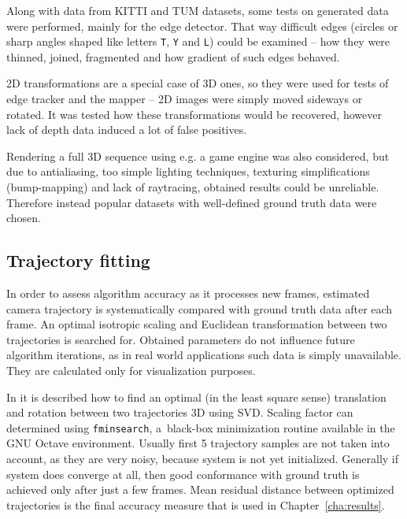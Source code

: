 Along with data from KITTI and TUM datasets, some tests on generated data were performed, mainly for the edge detector. That way difficult edges (circles or sharp angles shaped like letters \texttt{T}, \texttt{Y} and \texttt{L}) could be examined -- how they were thinned, joined, fragmented and how gradient of such edges behaved.

2D transformations are a special case of 3D ones, so they were used for tests of edge tracker and the mapper -- 2D images were simply moved sideways or rotated. It was tested how these transformations would be recovered, however lack of depth data induced a lot of false positives.

Rendering a full 3D sequence using e.g. a game engine was also considered, but due to antialiasing, too simple lighting techniques, texturing simplifications (bump-mapping) and lack of raytracing, obtained results could be unreliable. Therefore instead popular datasets with well-defined ground truth data were chosen.


\subsection{Trajectory fitting}

In order to assess algorithm accuracy as it processes new frames, estimated camera trajectory is systematically compared with ground truth data after each frame. An optimal isotropic scaling and Euclidean transformation between two trajectories is searched for. Obtained parameters do not influence future algorithm iterations, as in real world applications such data is simply unavailable. They are calculated only for visualization purposes.

In \cite{arun1987least} it is described how to find an optimal (in the least square sense) translation and rotation between two trajectories 3D using SVD. Scaling factor can determined using \texttt{fminsearch}, a~black-box minimization routine available in the GNU Octave environment. Usually first 5 trajectory samples are not taken into account, as they are very noisy, because system is not yet initialized. Generally if system does converge at all, then good conformance with ground truth is achieved only after just a few frames. Mean residual distance between optimized trajectories is the final accuracy measure that is used in Chapter~\ref{cha:results}.

